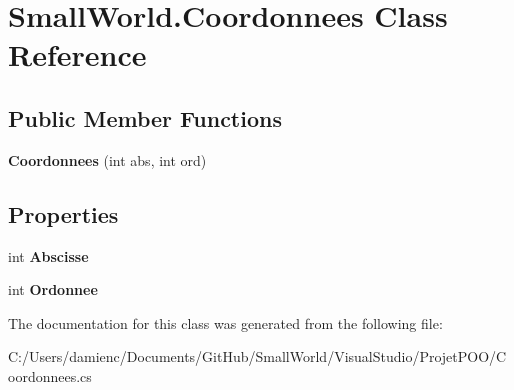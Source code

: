 \hypertarget{class_small_world_1_1_coordonnees}{\section{Small\-World.\-Coordonnees Class Reference}
\label{class_small_world_1_1_coordonnees}
}
\subsection*{Public Member Functions}
\begin{DoxyCompactItemize}
\item 
\hypertarget{class_small_world_1_1_coordonnees_a8e2b8cca08b25b6542a4d0e2b6364230}{{\bfseries Coordonnees} (int abs, int ord)}\label{class_small_world_1_1_coordonnees_a8e2b8cca08b25b6542a4d0e2b6364230}

\end{DoxyCompactItemize}
\subsection*{Properties}
\begin{DoxyCompactItemize}
\item 
\hypertarget{class_small_world_1_1_coordonnees_a2114c5dd343bb23dcdabfc3f79453f0f}{int {\bfseries Abscisse}}\label{class_small_world_1_1_coordonnees_a2114c5dd343bb23dcdabfc3f79453f0f}

\item 
\hypertarget{class_small_world_1_1_coordonnees_adc2838d4fe66cc7bdfa7cd04353a0fce}{int {\bfseries Ordonnee}}\label{class_small_world_1_1_coordonnees_adc2838d4fe66cc7bdfa7cd04353a0fce}

\end{DoxyCompactItemize}


The documentation for this class was generated from the following file\-:\begin{DoxyCompactItemize}
\item 
C\-:/\-Users/damienc/\-Documents/\-Git\-Hub/\-Small\-World/\-Visual\-Studio/\-Projet\-P\-O\-O/Coordonnees.\-cs\end{DoxyCompactItemize}
